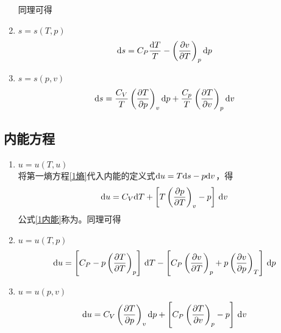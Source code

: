 \begin{enumerate}[1.]
	\noindent 同理可得
		\item $s = s(T,p)$\\
		\begin{align}
			{\rm{d}} s = C_P \dfrac{{\rm{d}} T}{T} - \left(\dfrac{\partial v}{\partial T}\right)_p {\rm{d}} p
			\label{2熵}
		\end{align}
		\item $s = s(p,v)$\\
		\begin{align}
			{\rm{d}} s = \dfrac{C_V}{T} \left(\dfrac{\partial T}{\partial p}\right)_v {\rm{d}} p + \dfrac{C_p}{T}\left(\dfrac{\partial T}{\partial v}\right)_p {\rm{d}} v
			\label{3熵}
		\end{align}
\end{enumerate}


\subsection{内能方程}
\begin{enumerate}[1.]
	\item $u = u(T,u)$\\
	将第一熵方程\eqref{1熵}代入内能的定义式${\rm{d}} u = T {\rm{d}} s - p {\rm{d}} v$，得
	\begin{align}
		{\rm{d}} u = C_V {\rm{d}} T + \left[T \left(\dfrac{\partial p}{\partial T}\right)_v - p\right]\, {\rm{d}} v
		\label{1内能}
	\end{align}
	公式\eqref{1内能}称为。同理可得
	\item $u = u(T,p)$\\
	\begin{align}
		{\rm{d}} u = \left[C_P - p \left(\dfrac{\partial T}{\partial T}\right)_p\right]\,{\rm{d}} T - \left[C_P \left(\dfrac{\partial v}{\partial T}\right)_ p + p\left( \dfrac{\partial v}{\partial p}\right)_T\right]\, {\rm{d}} p
		\label{2内能}
	\end{align}
	\item $u = u(p,v)$\\
	\begin{align}
		{\rm{d}} u = C_V\left(\dfrac{\partial T}{\partial p}\right)_v {\rm{d}} p + \left[C_P\left(\dfrac{\partial T}{\partial v}\right)_p - p\right]\, {\rm{d}} v
		\label{3内能}
	\end{align}
\end{enumerate}

